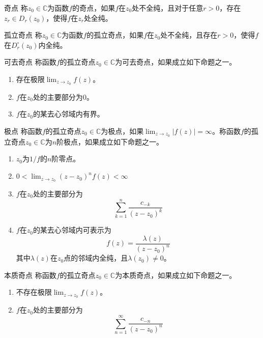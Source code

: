 \documentclass[lang = cn, scheme = chinese, thmcnt = section]{elegantbook}
\newcommand{\C}{\mathbb{C}}  		   %
\newcommand{\dis}{\displaystyle}
\begin{document}
\begin{definition}{奇点}
	称$z_0\in\C$为函数$f$的奇点，如果$f$在$z_0$处不全纯，且对于任意$r>0$，存在$z_r\in D_r(z_0)$，使得$f$在$z_r$处全纯。
\end{definition}

\begin{definition}{孤立奇点}
	称$z_0\in\C$为函数$f$的孤立奇点，如果$f$在$z_0$处不全纯，且存在$r>0$，使得$f$在$D^\circ_r(z_0)$内全纯。
\end{definition}

\begin{definition}{可去奇点}
	称函数$f$的孤立奇点$z_0\in\C$为可去奇点，如果成立如下命题之一。
	\begin{enumerate}
		\item 存在极限$\dis\lim_{z\to z_0}{f(z)}$。
		\item $f$在$z_0$处的主要部分为$0$。
		\item $f$在$z_0$的某去心邻域内有界。
	\end{enumerate}
\end{definition}

\begin{definition}{极点}
	称函数$f$的孤立奇点$z_0\in\C$为极点，如果$\dis\lim_{z\to z_0}|f(z)|=\infty$。称函数$f$的孤立奇点$z_0\in\C$为$n$阶极点，如果成立如下命题之一。
	\begin{enumerate}
		\item $z_0$为$1/f$的$n$阶零点。
		\item $\dis 0<\lim_{z\to z_0}(z-z_0)^nf(z)<\infty$
		\item $f$在$z_0$处的主要部分为%
		$$
		\sum_{k=1}^{n}{\frac{c_{-k}}{(z-z_0)^k}}
		$$
		\item $f$在$z_0$的某去心邻域内可表示为
		$$
		f(z)=\frac{\lambda(z)}{(z-z_0)^n}
		$$
		其中$\lambda(z)$在$z_0$点的邻域内全纯，且$\lambda(z_0)\ne0$。
	\end{enumerate}
\end{definition}

\begin{definition}{本质奇点}
	称函数$f$的孤立奇点$z_0\in\C$为本质奇点，如果成立如下命题之一。
	\begin{enumerate}
		\item 不存在极限$\dis\lim_{z\to z_0}f(z)$。
		\item $f$在$z_0$处的主要部分为
		$$
		\sum_{n=1}^{\infty}{\frac{c_{-n}}{(z-z_0)^n}}
		$$
	\end{enumerate}
\end{definition}
\end{document}
